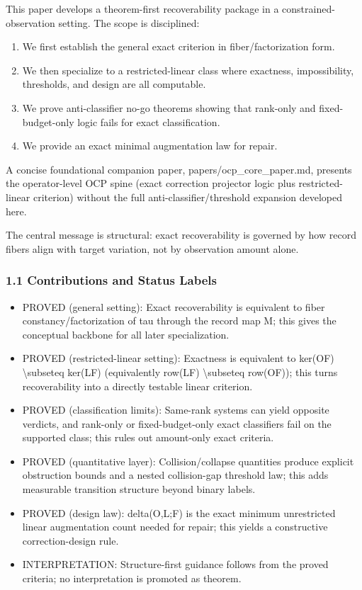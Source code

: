\documentclass[11pt]{article}
\begin{document}
This paper develops a theorem-first recoverability package in a constrained-observation setting. The scope is disciplined:

\begin{enumerate}
\item We first establish the general exact criterion in fiber/factorization form.
\item We then specialize to a restricted-linear class where exactness, impossibility, thresholds, and design are all computable.
\item We prove anti-classifier no-go theorems showing that rank-only and fixed-budget-only logic fails for exact classification.
\item We provide an exact minimal augmentation law for repair.
\end{enumerate}

A concise foundational companion paper, papers/ocp\_core\_paper.md, presents the operator-level OCP spine (exact correction projector logic plus restricted-linear criterion) without the full anti-classifier/threshold expansion developed here.


The central message is structural: exact recoverability is governed by how record fibers align with target variation, not by observation amount alone.


\subsubsection*{1.1 Contributions and Status Labels}
\begin{itemize}
\item PROVED (general setting): Exact recoverability is equivalent to fiber constancy/factorization of tau through the record map M; this gives the conceptual backbone for all later specialization.
\item PROVED (restricted-linear setting): Exactness is equivalent to ker(OF) \textbackslash{}subseteq ker(LF) (equivalently row(LF) \textbackslash{}subseteq row(OF)); this turns recoverability into a directly testable linear criterion.
\item PROVED (classification limits): Same-rank systems can yield opposite verdicts, and rank-only or fixed-budget-only exact classifiers fail on the supported class; this rules out amount-only exact criteria.
\item PROVED (quantitative layer): Collision/collapse quantities produce explicit obstruction bounds and a nested collision-gap threshold law; this adds measurable transition structure beyond binary labels.
\item PROVED (design law): delta(O,L;F) is the exact minimum unrestricted linear augmentation count needed for repair; this yields a constructive correction-design rule.
\item INTERPRETATION: Structure-first guidance follows from the proved criteria; no interpretation is promoted as theorem.
\end{itemize}
\end{document}
